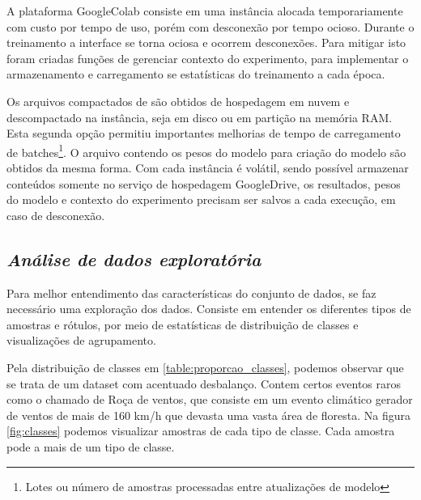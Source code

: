 A plataforma GoogleColab consiste em uma instância alocada temporariamente com custo por tempo de uso, porém com desconexão por tempo ocioso. Durante o treinamento a interface se torna ociosa e ocorrem desconexões. Para mitigar isto foram criadas funções de gerenciar contexto do experimento, para implementar o armazenamento e carregamento se estatísticas do treinamento a cada época.

Os arquivos compactados de são obtidos de hospedagem em nuvem e descompactado na instância, seja em disco ou em partição na memória RAM. Esta segunda opção permitiu importantes melhorias de tempo de carregamento de batches\footnote[1]{Lotes ou número de amostras processadas entre atualizações de modelo}. O arquivo contendo os pesos do modelo para criação do modelo são obtidos da mesma forma. Com cada instância é volátil, sendo possível armazenar conteúdos somente no serviço de hospedagem GoogleDrive, os resultados, pesos do modelo e contexto do experimento precisam ser salvos a cada execução, em caso de desconexão.


\subsection{\textit{Análise de dados exploratória}}\label{sec:Cap3_AnaliseDeDadosExploratoria}
Para melhor entendimento das características do conjunto de dados, se faz necessário uma exploração dos dados. Consiste em entender os diferentes tipos de amostras e rótulos, por meio de estatísticas de distribuição de classes e visualizações de agrupamento.


Pela distribuição de classes em \ref{table:proporcao_classes}, podemos observar que se trata de um dataset com acentuado desbalanço. Contem certos eventos raros como o chamado de Roça de ventos, que consiste em um evento climático gerador de ventos de mais de 160 km/h que devasta uma vasta área de floresta. Na figura \ref{fig:classes} podemos visualizar amostras de cada tipo de classe. Cada amostra pode a mais de um tipo de classe.  

